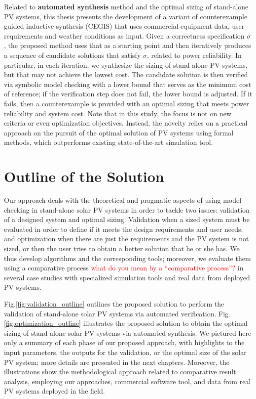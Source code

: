 Related to \textbf{automated synthesis} method and the optimal sizing of stand-alone PV systems, this thesis presents the development of a variant of counterexample guided inductive synthesis (CEGIS) that uses commercial equipment data, user requirements and weather conditions as input. Given a correctness specification $\sigma$, the proposed method uses that as a starting point and then iteratively produces a sequence of candidate solutions that satisfy $\sigma$, related to power reliability. In particular, in each iteration, we synthesize the sizing of stand-alone PV systems, but that may not achieve the lowest cost. The candidate solution is then verified via symbolic model checking with a lower bound that serves as the minimum cost of reference; if the verification step does not fail, the lower bound is adjusted. If it fails, then a counterexample is provided with an optimal sizing that meets power reliability and system cost. Note that in this study, the focus is not on new criteria or even optimization objectives. Instead, the novelty relies on a practical approach on the pursuit of the optimal solution of PV systems using formal methods, which outperforms existing state-of-the-art simulation tool.


\section{Outline of the Solution}

Our approach deals with the theoretical and pragmatic aspects of using model checking in stand-alone solar PV systems in order to tackle two issues: validation of a designed system and optimal sizing. Validation when a sized system must be evaluated in order to define if it meets the design requirements and user needs; and optimization when there are just the requirements and the PV system is not sized, or then the user tries to obtain a better solution that he or she has. We thus develop algorithms and the corresponding tools; moreover, we evaluate them using a comparative process \textcolor{red}{what do you mean by a ``comparative process''?} in several case studies with specialized simulation tools and real data from deployed PV systems.

Fig.\ref{fig:validation_outline} outlines the proposed solution to perform the validation of stand-alone solar PV systems via automated verification. Fig.\ref{fig:optimization_outline} illustrates the proposed solution to obtain the optimal sizing of stand-alone solar PV systems via automated synthesis. We pictured here only a summary of each phase of our proposed approach, with highlights to the input parameters, the outputs for the validation, or the optimal size of the solar PV system; more details are presented in the next chapters. Moreover, the illustrations show the methodological approach related to comparative result analysis, employing our approaches, commercial software tool, and data from real PV systems deployed in the field.

